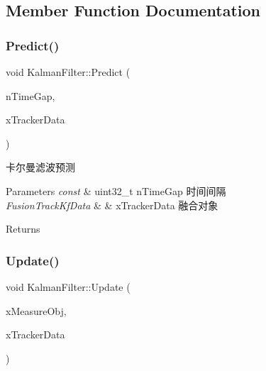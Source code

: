 \subsection{Member Function Documentation}
\mbox{\label{classKalmanFilter_a9c2e4175624640575fd1d0148eaef943}} 
\subsubsection{\texorpdfstring{Predict()}{Predict()}}
{\footnotesize\ttfamily void Kalman\+Filter\+::\+Predict (\begin{DoxyParamCaption}\item[{const uint32\+\_\+t}]{n\+Time\+Gap,  }\item[{Fusion\+Track\+Kf\+Data \&}]{x\+Tracker\+Data }\end{DoxyParamCaption})}



卡尔曼滤波预测 


\begin{DoxyParams}{Parameters}
{\em const} & uint32\+\_\+t n\+Time\+Gap 时间间隔 \\
\hline
{\em Fusion\+Track\+Kf\+Data} & \& x\+Tracker\+Data 融合对象 \\
\hline
\end{DoxyParams}
\begin{DoxyReturn}{Returns}

\end{DoxyReturn}
\mbox{\label{classKalmanFilter_a15ba39687fe9374e6f129923dde63c8a}} 
\subsubsection{\texorpdfstring{Update()}{Update()}\hspace{0.1cm}{\footnotesize\ttfamily [1/2]}}
{\footnotesize\ttfamily void Kalman\+Filter\+::\+Update (\begin{DoxyParamCaption}\item[{const Sensor\+Object \&}]{x\+Measure\+Obj,  }\item[{Fusion\+Track\+Kf\+Data \&}]{x\+Tracker\+Data }\end{DoxyParamCaption})}



